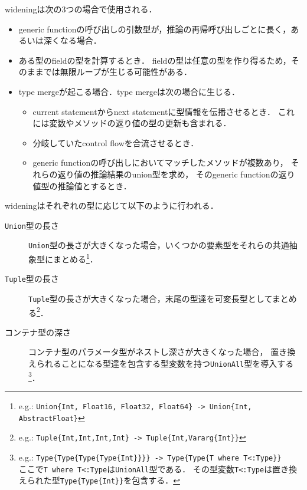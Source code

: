 wideningは次の3つの場合で使用される．

\begin{itemize}
  \item generic functionの呼び出しの引数型が，推論の再帰呼び出しごとに長く，あるいは深くなる場合\footnotemark．
  \item ある型のfieldの型を計算するとき．
        fieldの型は任意の型を作り得るため，そのままでは無限ループが生じる可能性がある．
  \item type mergeが起こる場合．type mergeは次の場合に生じる．
        \begin{itemize}
          \item current statementからnext statementに型情報を伝播させるとき．
                これには変数やメソッドの返り値の型の更新も含まれる．
          \item 分岐していたcontrol flowを合流させるとき．
          \item generic functionの呼び出しにおいてマッチしたメソッドが複数あり，
                それらの返り値の推論結果のunion型を求め，
                そのgeneric functionの返り値型の推論値とするとき．
        \end{itemize}
\end{itemize}


wideningはそれぞれの型に応じて以下のように行われる．

\begin{description}
  \item [\texttt{Union}型の長さ]
        \texttt{Union}型の長さが大きくなった場合，いくつかの要素型をそれらの共通抽象型にまとめる\footnote{
          e.g.: \texttt{Union\{Int, Float16, Float32, Float64\} -> Union\{Int, AbstractFloat\}}
        }．
  \item [\texttt{Tuple}型の長さ]
        \texttt{Tuple}型の長さが大きくなった場合，末尾の型達を可変長型としてまとめる\footnote{
          e.g.: \texttt{Tuple\{Int,Int,Int,Int\} -> Tuple\{Int,Vararg\{Int\}\}}
        }．
  \item [コンテナ型の深さ]
        コンテナ型のパラメータ型がネストし深さが大きくなった場合，
        置き換えられることになる型達を包含する型変数を持つ\texttt{UnionAll}型を導入する\footnote{
          e.g.: \texttt{Type\{Type\{Type\{Type\{Int\}\}\}\} -> Type\{Type\{T where T<:Type\}\}}\\
          ここで\texttt{T where T<:Type}は\texttt{UnionAll}型である．
          その型変数\texttt{T<:Type}は置き換えられた型\texttt{Type\{Type\{Int\}\}}を包含する．
        }．
\end{description}

